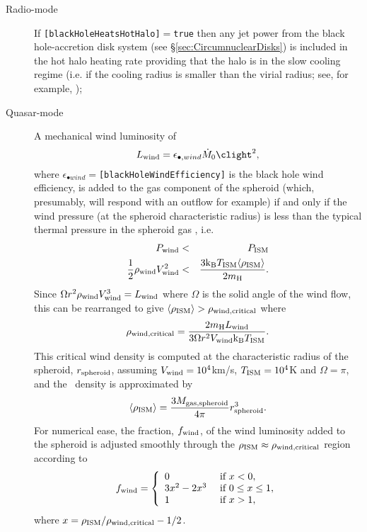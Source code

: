 \begin{description}
 \item [Radio-mode] If {\tt [blackHoleHeatsHotHalo]}$=${\tt true} then any jet power from the black hole-accretion disk system (see \S\ref{sec:CircumnuclearDisks}) is included in the hot halo heating rate providing that the halo is in the slow cooling regime (i.e. if the cooling radius is smaller than the virial radius; see, for example, \citealt{benson_cold_2010});
 \item [Quasar-mode] A mechanical wind luminosity of \citep{ostriker_momentum_2010}
\begin{equation}
 L_{\rm wind} = \epsilon_{\bullet, wind} \dot{M}_0 \clight^2,
\end{equation}
where $\epsilon_{\bullet wind}=${\tt [blackHoleWindEfficiency]} is the black hole wind efficiency, is added to the gas component of the spheroid (which, presumably, will respond with an outflow for example) if and only if the wind pressure (at the spheroid characteristic radius) is less than the typical thermal pressure in the spheroid gas \citep{ciotti_feedbackcentral_2009}, i.e.
\begin{eqnarray}
 P_{\rm wind} &<& P_{\rm ISM} \nonumber \\
 \frac{1}{2}\rho_{\rm wind} V_{\rm wind}^2 &<& {3 {\rm k_B} T_{\rm ISM} \langle \rho_{\rm ISM}\rangle \over 2 m_{\rm H}}.
\end{eqnarray}
Since $\Omega r^2 \rho_{\rm wind} V_{\rm wind}^3 = L_{\rm wind}$ where $\Omega$ is the solid angle of the wind flow, this can be rearranged to give $\langle\rho_{\rm ISM}\rangle > \rho_{\rm wind, critical}$ where
\begin{equation}
\rho_{\rm wind,critical} = {2 m_{\rm H} L_{\rm wind} \over 3 \Omega r^2 V_{\rm wind} {\rm k_B} T_{\rm ISM}}.
\end{equation}
This critical wind density is computed at the characteristic radius of the spheroid, $r_{\rm spheroid}$, assuming $V_{\rm wind}=10^4$km/s, $T_{\rm ISM}=10^4$K and $\Omega=\pi$, and the \ISM\ density is approximated by
\begin{equation}
 \langle\rho_{\rm ISM}\rangle = {3 M_{\rm gas, spheroid} \over 4 \pi} r_{\rm spheroid}^3.
\end{equation}
For numerical ease, the fraction, $f_{\rm wind}$, of the wind luminosity added to the spheroid is adjusted smoothly through the $\rho_{\rm ISM}\approx\rho_{\rm wind,critical}$ region according to
\begin{equation}
 f_{\rm wind} = \left\{ \begin{array}{ll} 0 & \hbox{ if } x < 0, \\ 3x^2-2x^3 & \hbox{ if } 0 \le x \le 1, \\ 1 & \hbox{ if } x > 1, \end{array} \right.
\end{equation}
where $x=\rho_{\rm ISM}/\rho_{\rm wind,critical}-1/2$.
\end{description}

